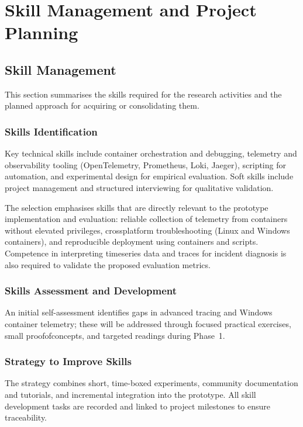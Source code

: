 \chapter{Skill Management and Project Planning}
\label{chap:Chapter2}

\section{Skill Management}
This section summarises the skills required for the research activities and the planned approach for acquiring or consolidating them.

\subsection{Skills Identification}
Key technical skills include container orchestration and debugging, telemetry and observability tooling (OpenTelemetry, Prometheus, Loki, Jaeger), scripting for automation, and experimental design for empirical evaluation. Soft skills include project management and structured interviewing for qualitative validation.

The selection emphasises skills that are directly relevant to the prototype implementation and evaluation: reliable collection of telemetry from containers without elevated privileges, cross\-platform troubleshooting (Linux and Windows containers), and reproducible deployment using containers and scripts. Competence in interpreting time\-series data and traces for incident diagnosis is also required to validate the proposed evaluation metrics.

\subsection{Skills Assessment and Development}
An initial self-assessment identifies gaps in advanced tracing and Windows container telemetry; these will be addressed through focused practical exercises, small proof\-of\-concepts, and targeted readings during Phase~1.

\subsection{Strategy to Improve Skills}
The strategy combines short, time-boxed experiments, community documentation and tutorials, and incremental integration into the prototype. All skill development tasks are recorded and linked to project milestones to ensure traceability.

